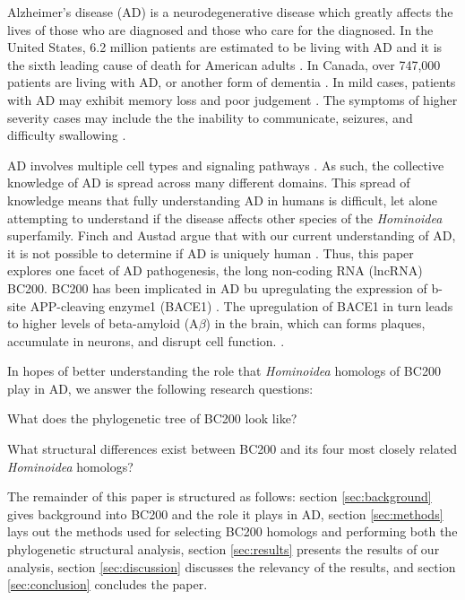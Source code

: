 \documentclass[conference, 11pt]{IEEEtran}
\begin{document}
Alzheimer's disease (AD) is a neurodegenerative disease which greatly affects the lives of those who are diagnosed and those who care for the diagnosed. 
In the United States, 6.2 million patients are estimated to be living with AD and it is the sixth leading cause of death for American adults \cite{AlzheimersDisease}. 
In Canada, over 747,000 patients are living with AD, or another form of dementia \cite{ADcanada}. 
In mild cases, patients with AD may exhibit memory loss and poor judgement \cite{alzheimersSigns}. 
The symptoms of higher severity cases may include the the inability to communicate, seizures, and difficulty swallowing \cite{alzheimersSigns}.

AD involves multiple cell types and signaling pathways \cite{zhang2021role}.  As such, the collective knowledge of AD is spread across many different domains. 
This spread of knowledge means that fully understanding AD in humans is difficult, let alone attempting to understand if the disease affects other species of the \emph{Hominoidea} superfamily.
Finch and Austad argue that with our current understanding of AD, it is not possible to determine if AD is uniquely human \cite{finch2015commentary}. 
Thus, this paper explores one facet of AD pathogenesis, the long non-coding RNA (lncRNA) BC200. 
BC200 has been implicated in AD bu upregulating the expression of b-site APP-cleaving enzyme1 (BACE1) \cite{li2018identification,zhang2021role}. 
The upregulation of BACE1 in turn leads to higher levels of beta-amyloid (A$\beta$) in the brain, which can forms plaques, accumulate in neurons, and disrupt cell function. \cite{li2018identification,zhang2021role}. 

In hopes of better understanding the role that \emph{Hominoidea} homologs of BC200 play in AD, we answer the following research questions:

\begin{questions}
  \item What does the phylogenetic tree of BC200 look like?
  \item What structural differences exist between BC200 and its four most closely related \emph{Hominoidea} homologs?
\end{questions}

The remainder of this paper is structured as follows: section \ref{sec:background} gives background into BC200 and the role it plays in AD, section \ref{sec:methods} lays out the methods used for selecting BC200 homologs and performing both the phylogenetic structural analysis, section \ref{sec:results} presents the results of our analysis, section \ref{sec:discussion} discusses the relevancy of the results, and section \ref{sec:conclusion} concludes the paper.
\end{document}
